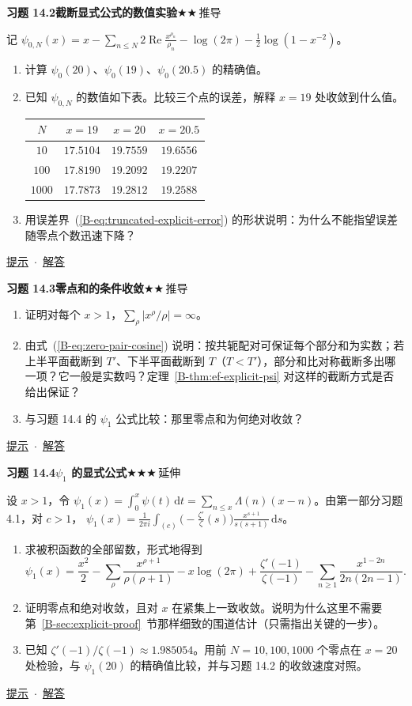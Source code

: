 \documentclass[11pt,a4paper]{article}
\newcommand{\dd}{\,\mathrm{d}}
\renewcommand{\Re}{\operatorname{Re}}
\newcommand{\bref}[1]{\ref*{B-#1}}
\newcommand{\lvII}{$\bigstar\bigstar$\,推导}
\newcommand{\lvIII}{$\bigstar\bigstar\bigstar$\,延伸}
\newcommand{\Q}[3]{%
  \par\addvspace{1.1em}\noindent
  \hypertarget{q:#1}{}\textbf{习题 #1}\quad\textbf{#3}\hfill{\small #2}\par
  \nopagebreak\smallskip}
\newcommand{\toHint}[1]{\hfill{\small\hyperlink{h:#1}{提示}\ $\cdot$\ \hyperlink{s:#1}{解答}}}
\begin{document}
\Q{14.2}{\lvII}{截断显式公式的数值实验}
记 $\psi_{0,N}(x)=x-\sum_{n\le N}2\Re\frac{x^{\rho_n}}{\rho_n}-\log(2\pi)-\frac12\log(1-x^{-2})$。
\begin{enumerate}
  \item 计算 $\psi_0(20)$、$\psi_0(19)$、$\psi_0(20.5)$ 的精确值。
  \item 已知 $\psi_{0,N}$ 的数值如下表。比较三个点的误差，解释 $x=19$ 处收敛到什么值。
  \begin{center}
  \small
  \begin{tabular}{@{}cccc@{}}
  \toprule
  $N$ & $x=19$ & $x=20$ & $x=20.5$ \\
  \midrule
  $10$ & $17.5104$ & $19.7559$ & $19.6556$ \\
  $100$ & $17.8190$ & $19.2092$ & $19.2207$ \\
  $1000$ & $17.7873$ & $19.2812$ & $19.2588$ \\
  \bottomrule
  \end{tabular}
  \end{center}
  \item 用误差界~(\bref{eq:truncated-explicit-error}) 的形状说明：为什么不能指望误差随零点个数迅速下降？
\end{enumerate}
\toHint{14.2}

\Q{14.3}{\lvII}{零点和的条件收敛}
\begin{enumerate}
  \item 证明对每个 $x>1$，$\sum_\rho|x^\rho/\rho|=\infty$。
  \item 由式~(\bref{eq:zero-pair-cosine}) 说明：按共轭配对可保证每个部分和为实数；若上半平面截断到 $T'$、下半平面截断到 $T$（$T<T'$），部分和比对称截断多出哪一项？它一般是实数吗？定理~\bref{thm:ef-explicit-psi} 对这样的截断方式是否给出保证？
  \item 与习题 14.4 的 $\psi_1$ 公式比较：那里零点和为何绝对收敛？
\end{enumerate}
\toHint{14.3}

\Q{14.4}{\lvIII}{$\psi_1$ 的显式公式}
设 $x>1$，令 $\psi_1(x)=\int_0^x\psi(t)\dd t=\sum_{n\le x}\Lambda(n)(x-n)$。由第一部分习题 4.1，对 $c>1$，
$\psi_1(x)=\frac1{2\pi i}\int_{(c)}\bigl(-\frac{\zeta'}{\zeta}(s)\bigr)\frac{x^{s+1}}{s(s+1)}\dd s$。
\begin{enumerate}
  \item 求被积函数的全部留数，形式地得到
  \[
    \psi_1(x)=\frac{x^2}2-\sum_\rho\frac{x^{\rho+1}}{\rho(\rho+1)}-x\log(2\pi)+\frac{\zeta'(-1)}{\zeta(-1)}-\sum_{n\ge1}\frac{x^{1-2n}}{2n(2n-1)} .
  \]
  \item 证明零点和绝对收敛，且对 $x$ 在紧集上一致收敛。说明为什么这里不需要第~\bref{sec:explicit-proof}~节那样细致的围道估计（只需指出关键的一步）。
  \item 已知 $\zeta'(-1)/\zeta(-1)\approx1.985054$。用前 $N=10,100,1000$ 个零点在 $x=20$ 处检验，与 $\psi_1(20)$ 的精确值比较，并与习题 14.2 的收敛速度对照。
\end{enumerate}
\toHint{14.4}
\end{document}
